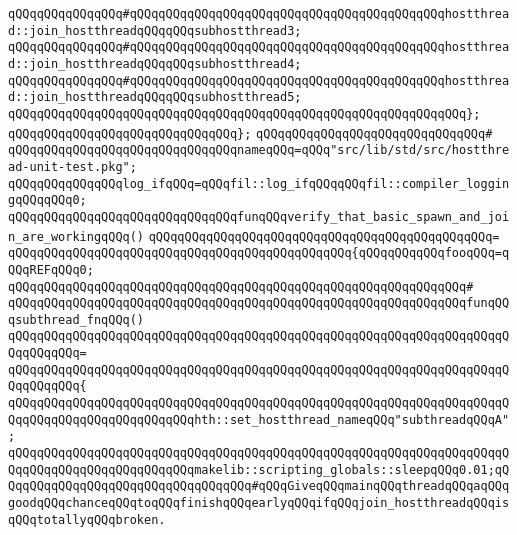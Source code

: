 \verb|qQQqqQQqqQQqqQQq#qQQqqQQqqQQqqQQqqQQqqQQqqQQqqQQqqQQqqQQqqQQqhostthread::join_hostthreadqQQqqQQqsubhostthread3;|\newline
\verb|qQQqqQQqqQQqqQQq#qQQqqQQqqQQqqQQqqQQqqQQqqQQqqQQqqQQqqQQqqQQqhostthread::join_hostthreadqQQqqQQqsubhostthread4;|\newline
\verb|qQQqqQQqqQQqqQQq#qQQqqQQqqQQqqQQqqQQqqQQqqQQqqQQqqQQqqQQqqQQqhostthread::join_hostthreadqQQqqQQqsubhostthread5;|\newline
\verb|qQQqqQQqqQQqqQQqqQQqqQQqqQQqqQQqqQQqqQQqqQQqqQQqqQQqqQQqqQQqqQQq};|\newline
\verb|qQQqqQQqqQQqqQQqqQQqqQQqqQQqqQQq};|\newline
\verb|qQQqqQQqqQQqqQQqqQQqqQQqqQQqqQQq#|\newline
\newline
\newline
\newline
\verb|qQQqqQQqqQQqqQQqqQQqqQQqqQQqqQQqnameqQQq=qQQq"src/lib/std/src/hostthread-unit-test.pkg";|\newline
\newline
\verb|qQQqqQQqqQQqqQQqlog_ifqQQq=qQQqfil::log_ifqQQqqQQqfil::compiler_loggingqQQqqQQq0;|\newline
\newline
\verb|qQQqqQQqqQQqqQQqqQQqqQQqqQQqqQQqfunqQQqverify_that_basic_spawn_and_join_are_workingqQQq()|\newline
\verb|qQQqqQQqqQQqqQQqqQQqqQQqqQQqqQQqqQQqqQQqqQQqqQQq=|\newline
\verb|qQQqqQQqqQQqqQQqqQQqqQQqqQQqqQQqqQQqqQQqqQQqqQQq{qQQqqQQqqQQqfooqQQq=qQQqREFqQQq0;|\newline
\verb|qQQqqQQqqQQqqQQqqQQqqQQqqQQqqQQqqQQqqQQqqQQqqQQqqQQqqQQqqQQqqQQq#|\newline
\verb|qQQqqQQqqQQqqQQqqQQqqQQqqQQqqQQqqQQqqQQqqQQqqQQqqQQqqQQqqQQqqQQqfunqQQqsubthread_fnqQQq()|\newline
\verb|qQQqqQQqqQQqqQQqqQQqqQQqqQQqqQQqqQQqqQQqqQQqqQQqqQQqqQQqqQQqqQQqqQQqqQQqqQQqqQQq=|\newline
\verb|qQQqqQQqqQQqqQQqqQQqqQQqqQQqqQQqqQQqqQQqqQQqqQQqqQQqqQQqqQQqqQQqqQQqqQQqqQQqqQQq{|\newline
\verb|qQQqqQQqqQQqqQQqqQQqqQQqqQQqqQQqqQQqqQQqqQQqqQQqqQQqqQQqqQQqqQQqqQQqqQQqqQQqqQQqqQQqqQQqqQQqqQQqhth::set_hostthread_nameqQQq"subthreadqQQqA";|\newline
\newline
\verb|qQQqqQQqqQQqqQQqqQQqqQQqqQQqqQQqqQQqqQQqqQQqqQQqqQQqqQQqqQQqqQQqqQQqqQQqqQQqqQQqqQQqqQQqqQQqqQQqmakelib::scripting_globals::sleepqQQq0.01;qQQqqQQqqQQqqQQqqQQqqQQqqQQqqQQqqQQq#qQQqGiveqQQqmainqQQqthreadqQQqaqQQqgoodqQQqchanceqQQqtoqQQqfinishqQQqearlyqQQqifqQQqjoin_hostthreadqQQqisqQQqtotallyqQQqbroken.|\newline
